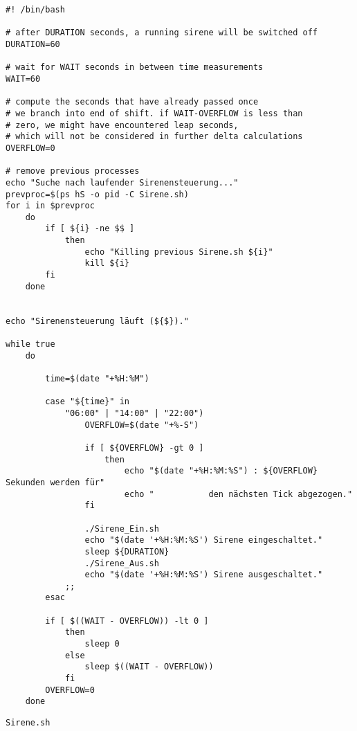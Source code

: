 \begin{listing}[H]
    \begin{verbatim}
#! /bin/bash

# after DURATION seconds, a running sirene will be switched off
DURATION=60

# wait for WAIT seconds in between time measurements
WAIT=60

# compute the seconds that have already passed once
# we branch into end of shift. if WAIT-OVERFLOW is less than
# zero, we might have encountered leap seconds,
# which will not be considered in further delta calculations
OVERFLOW=0

# remove previous processes
echo "Suche nach laufender Sirenensteuerung..."
prevproc=$(ps hS -o pid -C Sirene.sh)
for i in $prevproc
    do
        if [ ${i} -ne $$ ]
            then
                echo "Killing previous Sirene.sh ${i}"
                kill ${i}
        fi
    done


echo "Sirenensteuerung läuft (${$})."

while true
    do

        time=$(date "+%H:%M")

        case "${time}" in
            "06:00" | "14:00" | "22:00")
                OVERFLOW=$(date "+%-S")

                if [ ${OVERFLOW} -gt 0 ]
                    then
                        echo "$(date "+%H:%M:%S") : ${OVERFLOW} Sekunden werden für"
                        echo "           den nächsten Tick abgezogen."
                fi

                ./Sirene_Ein.sh
                echo "$(date '+%H:%M:%S') Sirene eingeschaltet."
                sleep ${DURATION}
                ./Sirene_Aus.sh
                echo "$(date '+%H:%M:%S') Sirene ausgeschaltet."
            ;;
        esac

        if [ $((WAIT - OVERFLOW)) -lt 0 ]
            then
                sleep 0
            else
                sleep $((WAIT - OVERFLOW))
            fi
        OVERFLOW=0
    done
    \end{verbatim}
    \caption{\texttt{Sirene.sh}}
    \label{lst:sirene}
\end{listing}

